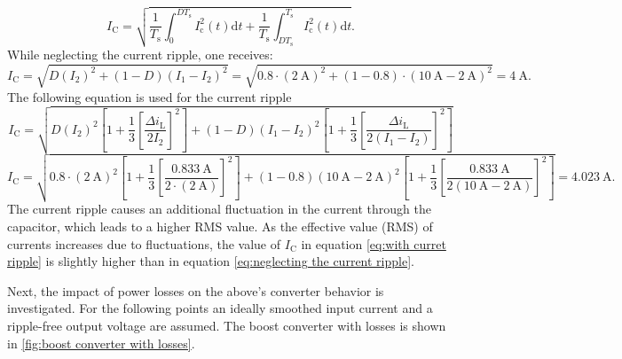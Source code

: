\begin{solutionblock}
\begin{equation}
        I_\mathrm{C}=\sqrt{\frac{1}{T_\mathrm{s}}\int_{0}^{DT_\mathrm{s}}I_\mathrm{c}^2(t)\mathrm{d}t+\frac{1}{T_\mathrm{s}}\int_{DT_\mathrm{s}}^{T_\mathrm{s}}I_\mathrm{c}^2(t)\mathrm{d}t}.
     \end{equation}
     While neglecting the current ripple, one receives:
     \begin{equation}
        I_\mathrm{C}=\sqrt{D (I_\mathrm{2})^2+(1-D)(I_\mathrm{1}-I_\mathrm{2})^2}=\sqrt{0.8\cdot (\SI{2}{\ampere})^2+(1-0.8)\cdot(\SI{10}{\ampere}-\SI{2}{\ampere})^2} = \SI{4}{\ampere}. \label{eq:neglecting the current ripple}
     \end{equation}
     The following equation is used for the current ripple
     \begin{equation}
        I_\mathrm{C}=\sqrt{D (I_\mathrm{2})^2\left[1+\frac{1}{3}\left[\frac{\Delta i_\mathrm{L}}{2I_\mathrm{2}}\right]^2\right]+(1-D)(I_\mathrm{1}-I_\mathrm{2})^2\left[1+\frac{1}{3}\left[\frac{\Delta i_\mathrm{L}}{2(I_\mathrm{1}-I_\mathrm{2})}\right]^2\right]} 
    \end{equation}
    \begin{equation}
        I_\mathrm{C}=\sqrt{0.8 \cdot (\SI{2}{\ampere})^2 \left[1+\frac{1}{3}\left[\frac{\SI{0.833}{\ampere}}{2\cdot (\SI{2}{\ampere})}\right]^2\right]+(1-0.8)(\SI{10}{\ampere}- \SI{2}{\ampere})^2\left[1+\frac{1}{3}\left[\frac{\SI{0.833}{\ampere}}{2(\SI{10}{\ampere}- \SI{2}{\ampere})}\right]^2\right]}=\SI{4.023}{\ampere}. \label{eq:with curret ripple}
    \end{equation}
    The current ripple causes an additional fluctuation in the current through the capacitor, which leads to a higher RMS value. As the effective value (RMS) of currents increases due to fluctuations, the value of $ I_\mathrm{C}$ in equation \eqref{eq:with curret ripple} is slightly higher than in equation \eqref{eq:neglecting the current ripple}.
\end{solutionblock}

Next, the impact of power losses on the above's converter behavior is investigated. For the following points an ideally smoothed input current and a ripple-free output voltage are assumed. The boost converter with losses  is shown in \autoref{fig:boost converter with losses}.



